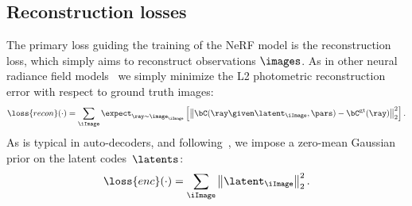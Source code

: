   \subsection{Reconstruction losses}
    \label{sec:conerf-autodecode}
    The primary loss guiding the training of the NeRF model is the reconstruction
    loss, which simply aims to reconstruct observations $\images$.
    As in other neural radiance field models~\cite{mildenhall2020nerf, martin2021nerfw, park2020deformable, park2021hypernerf} we simply minimize the L2 photometric reconstruction error with respect to ground truth images:
    \begin{equation}
      \loss{recon}(\cdot) = \sum_\iImage \expect_{\ray \sim \image_\iImage} \left[ \left\|\bC(\ray \given \latent_\iImage, \pars)-\bC^\text{gt}(\ray) \right\|_2^2 \right]
      .
      \label{eq:conerf-recon}
    \end{equation}
    As is typical in auto-decoders, and following~\cite{park2019deepsdf}, we impose a zero-mean Gaussian prior on the latent codes~$\latents$:
    \begin{equation}
      \loss{enc}(\cdot) = \sum_\iImage \left\| \latent_\iImage \right\|^2_2
      .
      \label{eq:conerf-latent_prior}
    \end{equation}

